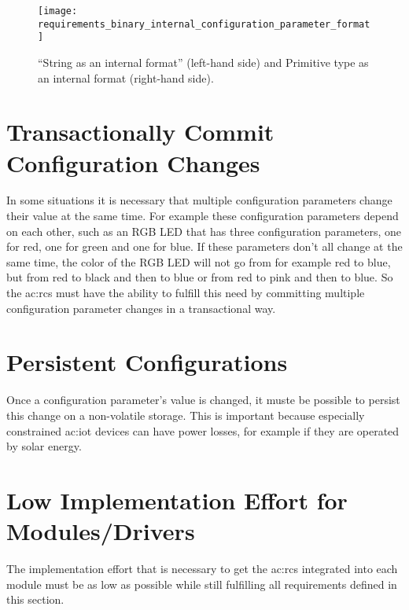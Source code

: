 \begin{figure}[H]
    \centering
    \texttt{[image: requirements\_binary\_internal\_configuration\_parameter\_format]}
    \caption{``String as an internal format'' (left-hand side) and Primitive type as an internal format (right-hand side).}
    \label{fig:evaluation:requirements:binary_internal_configuration_parameter_format}
\end{figure}


\section{Transactionally Commit Configuration Changes}
\label{sec:requirements:transactionally_commit_configuration_changes}

In some situations it is necessary that multiple configuration parameters change their value at the same time.
For example these configuration parameters depend on each other, such as an RGB LED that has three configuration parameters, one for red, one for green and one for blue.
If these parameters don't all change at the same time, the color of the RGB LED will not go from for example red to blue, but from red to black and then to blue or from red to pink and then to blue.
So the \gls{ac:rcs} must have the ability to fulfill this need by committing multiple configuration parameter changes in a transactional way.

\section{Persistent Configurations}
\label{sec:requirements:persistent_configurations}

Once a configuration parameter's value is changed, it muste be possible to persist this change on a non-volatile storage.
This is important because especially constrained \gls{ac:iot} devices can have power losses, for example if they are operated by solar energy.

\section{Low Implementation Effort for Modules/Drivers}
\label{sec:requirements:low_implementation_effort_for_modules_and_drivers}

The implementation effort that is necessary to get the \gls{ac:rcs} integrated into each module must be as low as possible while still fulfilling all requirements defined in this section.

